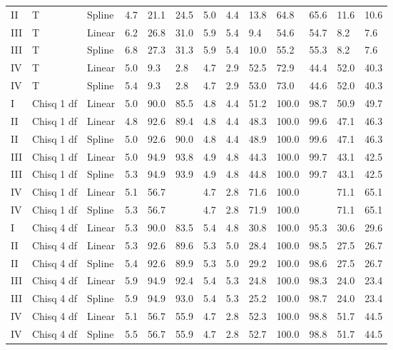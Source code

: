 \documentclass{article}\usepackage[]{graphicx}\usepackage[]{color}
\begin{document}
\begin{table}[ht]
\begin{tabular}{lll|lllll|lllll}
  II & T & Spline & 4.7 & 21.1 & 24.5 & 5.0 & 4.4 & 13.8 & 64.8 & 65.6 & 11.6 & 10.6 \\ 
  III & T & Linear & 6.2 & 26.8 & 31.0 & 5.9 & 5.4 & 9.4 & 54.6 & 54.7 & 8.2 & 7.6 \\ 
  III & T & Spline & 6.8 & 27.3 & 31.3 & 5.9 & 5.4 & 10.0 & 55.2 & 55.3 & 8.2 & 7.6 \\ 
  IV & T & Linear & 5.0 & 9.3 & 2.8 & 4.7 & 2.9 & 52.5 & 72.9 & 44.4 & 52.0 & 40.3 \\ 
  IV & T & Spline & 5.4 & 9.3 & 2.8 & 4.7 & 2.9 & 53.0 & 73.0 & 44.6 & 52.0 & 40.3 \\ 
   \hline
I & Chisq 1 df & Linear & 5.0 & 90.0 & 85.5 & 4.8 & 4.4 & 51.2 & 100.0 & 98.7 & 50.9 & 49.7 \\ 
  II & Chisq 1 df & Linear & 4.8 & 92.6 & 89.4 & 4.8 & 4.4 & 48.3 & 100.0 & 99.6 & 47.1 & 46.3 \\ 
  II & Chisq 1 df & Spline & 5.0 & 92.6 & 90.0 & 4.8 & 4.4 & 48.9 & 100.0 & 99.6 & 47.1 & 46.3 \\ 
  III & Chisq 1 df & Linear & 5.0 & 94.9 & 93.8 & 4.9 & 4.8 & 44.3 & 100.0 & 99.7 & 43.1 & 42.5 \\ 
  III & Chisq 1 df & Spline & 5.3 & 94.9 & 93.9 & 4.9 & 4.8 & 44.8 & 100.0 & 99.7 & 43.1 & 42.5 \\ 
  IV & Chisq 1 df & Linear & 5.1 & 56.7 &  & 4.7 & 2.8 & 71.6 & 100.0 &  & 71.1 & 65.1 \\ 
  IV & Chisq 1 df & Spline & 5.3 & 56.7 &  & 4.7 & 2.8 & 71.9 & 100.0 &  & 71.1 & 65.1 \\ 
   \hline
I & Chisq 4 df & Linear & 5.3 & 90.0 & 83.5 & 5.4 & 4.8 & 30.8 & 100.0 & 95.3 & 30.6 & 29.6 \\ 
  II & Chisq 4 df & Linear & 5.3 & 92.6 & 89.6 & 5.3 & 5.0 & 28.4 & 100.0 & 98.5 & 27.5 & 26.7 \\ 
  II & Chisq 4 df & Spline & 5.4 & 92.6 & 89.9 & 5.3 & 5.0 & 29.2 & 100.0 & 98.6 & 27.5 & 26.7 \\ 
  III & Chisq 4 df & Linear & 5.9 & 94.9 & 92.4 & 5.4 & 5.3 & 24.8 & 100.0 & 98.3 & 24.0 & 23.4 \\ 
  III & Chisq 4 df & Spline & 5.9 & 94.9 & 93.0 & 5.4 & 5.3 & 25.2 & 100.0 & 98.7 & 24.0 & 23.4 \\ 
  IV & Chisq 4 df & Linear & 5.1 & 56.7 & 55.9 & 4.7 & 2.8 & 52.3 & 100.0 & 98.8 & 51.7 & 44.5 \\ 
  IV & Chisq 4 df & Spline & 5.5 & 56.7 & 55.9 & 4.7 & 2.8 & 52.7 & 100.0 & 98.8 & 51.7 & 44.5 \\ 
   \hline
\end{tabular}
\end{table}
\end{document}
